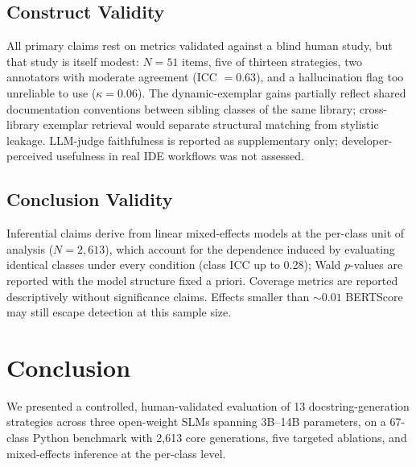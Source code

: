 \documentclass[pdflatex,sn-mathphys-ay]{sn-jnl}%
\theoremstyle{thmstyleone}%
\theoremstyle{thmstyletwo}%
\theoremstyle{thmstylethree}%
\begin{document}
{\subsection{Construct Validity}
All primary claims rest on metrics validated against a blind human study, but that study is itself modest: $N=51$ items, five of thirteen strategies, two annotators with moderate agreement (ICC $=0.63$), and a hallucination flag too unreliable to use ($\kappa=0.06$). The dynamic-exemplar gains partially reflect shared documentation conventions between sibling classes of the same library; cross-library exemplar retrieval would separate structural matching from stylistic leakage. LLM-judge faithfulness is reported as supplementary only; developer-perceived usefulness in real IDE workflows was not assessed.

\subsection{Conclusion Validity}
Inferential claims derive from linear mixed-effects models at the per-class unit of analysis ($N=2{,}613$), which account for the dependence induced by evaluating identical classes under every condition (class ICC up to 0.28); Wald $p$-values are reported with the model structure fixed a priori. Coverage metrics are reported descriptively without significance claims. Effects smaller than ${\sim}0.01$ BERTScore may still escape detection at this sample size.

\section{Conclusion}
\label{sec:conclusion}
We presented a controlled, human-validated evaluation of 13 docstring-generation strategies across three open-weight SLMs spanning 3B--14B parameters, on a 67-class Python benchmark with 2,613 core generations, five targeted ablations, and mixed-effects inference at the per-class level.

}
\end{document}
